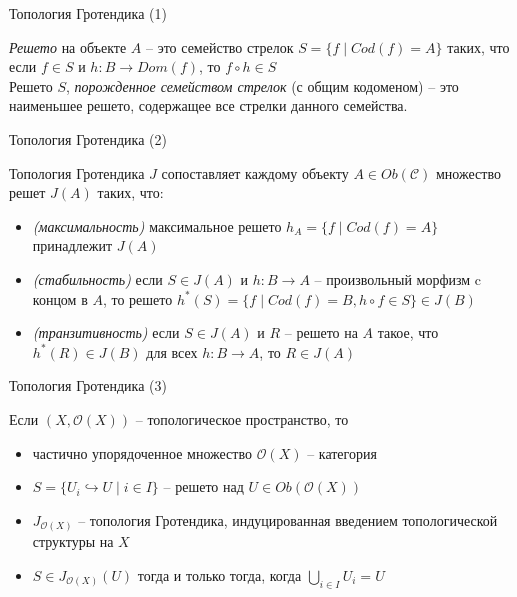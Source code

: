 \documentclass{beamer}
\begin{document}
\begin{frame}{Топология Гротендика (1)}
\begin{small}
\textit{Решето} на объекте $A$ -- это семейство стрелок $S = \{ f \; \vert \; Cod(f) = A \}$ таких, что если $f \in S$ и $h : B \to Dom(f)$, то $f \circ h \in S$\\
\medskip
Решето $S$, \textit{порожденное семейством стрелок} (с общим кодоменом) -- это наименьшее решето, содержащее все стрелки данного семейства.
\end{small}
\end{frame}

\begin{frame}{Топология Гротендика (2)}
\medskip
\begin{small}
Топология Гротендика $J$ сопоставляет каждому объекту $A \in Ob(\mathcal{C})$ множество решет $J(A)$ таких, что:\\
\bigskip
\begin{itemize}
	\item \textit{(максимальность)} максимальное решето $h_A = \{ f \; \vert \; Cod(f) = A \}$ принадлежит $J(A)$
	\item \textit{(стабильность)} если $S \in J(A)$ и $h : B \to A$ -- произвольный морфизм c концом в $A$, то решето $h^*(S) = \{ f \; \vert \; Cod(f) = B, h \circ f \in S \} \in J(B)$
	\item \textit{(транзитивность)} если $S \in J(A)$ и $R$ -- решето на $A$ такое, что $h^*(R) \in J(B)$ для всех $h : B \to A$, то $R \in J(A)$
\end{itemize}
\end{small}
\end{frame}

\begin{frame}{Топология Гротендика (3)}
\medskip
\begin{small}
Если $(X, \mathcal{O}(X))$ -- топологическое пространство, то
\bigskip
\begin{itemize}
	\item частично упорядоченное множество $\mathcal{O}(X)$ -- категория
	\item $S = \{ U_i \hookrightarrow U \; \vert \; i \in I \}$ -- решето над $U \in Ob(\mathcal{O}(X))$
	\item $J_{\mathcal{O}(X)}$ -- топология Гротендика, индуцированная введением топологической структуры на $X$
	\item $S \in J_{\mathcal{O}(X)}(U)$ тогда и только тогда, когда $\bigcup_{i \in I} U_i = U$
\end{itemize}
\end{small}
\end{frame}
\end{document}
